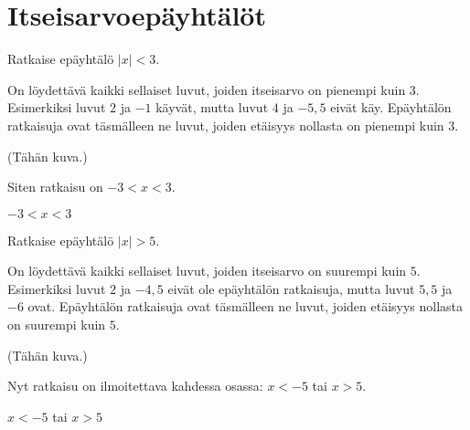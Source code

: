 \section{Itseisarvoepäyhtälöt}


\begin{esimerkki}
Ratkaise epäyhtälö $|x|<3$.

\begin{esimratk}
On löydettävä kaikki sellaiset luvut, joiden itseisarvo on pienempi kuin $3$. Esimerkiksi luvut $2$ ja $-1$ käyvät, mutta luvut $4$ ja $-5,5$ eivät käy. Epäyhtälön ratkaisuja ovat täsmälleen ne luvut, joiden etäisyys nollasta on pienempi kuin $3$.

(Tähän kuva.)

Siten ratkaisu on $-3<x<3$.
\end{esimratk}

\begin{esimvast}
$-3<x<3$
\end{esimvast}


\end{esimerkki}

\begin{esimerkki}
Ratkaise epäyhtälö $|x|>5$.

\begin{esimratk}
On löydettävä kaikki sellaiset luvut, joiden itseisarvo on suurempi kuin $5$. Esimerkiksi luvut $2$ ja $-4,5$ eivät ole epäyhtälön ratkaisuja, mutta luvut $5,5$ ja $-6$ ovat. Epäyhtälön ratkaisuja ovat täsmälleen ne luvut, joiden etäisyys nollasta on suurempi kuin $5$.
 
(Tähän kuva.)

Nyt ratkaisu on ilmoitettava kahdessa osassa: $x<-5$ tai $x>5$.
\end{esimratk}

\begin{esimvast}
$x<-5$ tai $x>5$
\end{esimvast}
\end{esimerkki}

